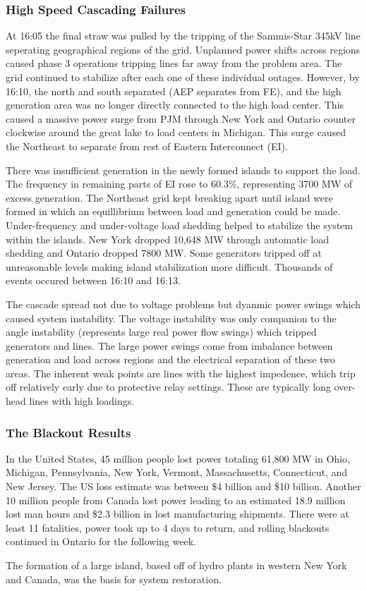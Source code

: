 \subsubsection{High Speed Cascading Failures}
At 16:05 the final straw was pulled by the tripping of the Sammis-Star 345kV line seperating geographical regions of the grid.  Unplanned power shifts across regions caused phase 3 operations tripping lines far away from the problem area.  The grid continued to stabilize after each one of these individual outages.  However, by 16:10, the north and south separated (AEP separates from FE), and the high generation area was no longer directly connected to the high load center.  This caused a massive power surge from PJM through New York and Ontario counter clockwise around the great lake to load centers in Michigan. This surge caused the Northeast to separate from rest of Eastern Interconnect (EI).

There was insufficient generation in the newly formed islands to support the load.  The frequency in remaining parts of EI rose to 60.3\%, representing 3700 MW of excess generation.  The Northeast grid kept breaking apart until island were formed in which an equillibrium between load and generation could be made.  Under-frequency and under-voltage load shedding helped to stabilize the system within the islands.  New York dropped 10,648 MW through automatic load shedding and Ontario dropped 7800 MW.  Some generators tripped off at unreasonable levels making island stabilization more difficult.  Thousands of events occured between 16:10 and 16:13.  

The cascade spread not due to voltage problems but dyanmic power swings which caused system instability.  The voltage instability was only companion to the angle instability (represents large real power flow swings) which tripped generators and lines.  The large power swings come from imbalance between generation and load across regions and the electrical separation of these two areas.  The inherent weak points are lines with the highest impedence, which trip off relatively early due to protective relay settings.  These are typically long over-head lines with high loadings.


\subsubsection{The Blackout Results}
In the United States, 45 million people lost power totaling 61,800 MW in Ohio, Michigan, Pennsylvania, New York, Vermont, Massachusetts, Connecticut, and New Jersey.  The US loss estimate was between \$4 billion and \$10 billion.  Another 10 million people from Canada lost power leading to an estimated 18.9 million lost man hours and \$2.3 billion in lost manufacturing shipments.   There were at least 11 fatalities, power took up to 4 days to return, and rolling blackouts continued in Ontario for the following week.\cite{northeast_2003}

The formation of a large island, based off of hydro plants in western New York and Canada, was the basis for system restoration.


